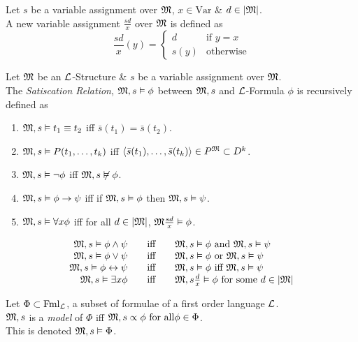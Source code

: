 \documentclass[11pt,a4paper]{article}
\begin{document}
Let $s$ be a variable assignment over $\mathfrak{M}$, $x\in\text{Var}$ \& $d\in|\mathfrak{M}|$.\\
A new variable assignment $\frac{sd}{x}$ over $\mathfrak{M}$ is defined as
$$\frac{sd}{x}(y)=\begin{cases}d&\text{if }y=x\\s(y)&\text{otherwise}\end{cases}$$

Let $\mathfrak{M}$ be an $\mathcal{L}$-Structure \& $s$ be a variable assignment over $\mathfrak{M}$.\\
The \textit{Satiscation Relation}, $\mathfrak{M},s\vDash\phi$ between $\mathfrak{M},s$ and $\mathcal{L}$-Formula $\phi$ is recursively defined as
\begin{enumerate}
	\item $\mathfrak{M},s\vDash t_1\equiv t_2$ iff $\bar{s}(t_1)=\bar{s}(t_2)$.
	\item $\mathfrak{M},s\vDash P(t_1,\dots,t_k)$ iff $\langle\bar{s}(t_1),\dots,\bar{s}(t_k)\rangle\in P^{\mathfrak{M}}\subset D^k$.
	\item $\mathfrak{M},s\vDash \neg\phi$ iff $\mathfrak{M},s\not\vDash\phi$.
	\item $\mathfrak{M},s\vDash\phi\to\psi$ iff if $\mathfrak{M},s\vDash\phi$ then $\mathfrak{M},s\vDash\psi$.
	\item $\mathfrak{M},s\vDash \forall x\phi$ iff for all $d\in|\mathfrak{M}|$, $\mathfrak{M}\frac{sd}{x}\vDash\phi$.
\end{enumerate}

\[\begin{array}{rcl}
\mathfrak{M},s\vDash\phi\wedge\psi&\quad\text{iff}\quad&\mathfrak{M},s\vDash\phi\text{ and }\mathfrak{M},s\vDash\psi\\
\mathfrak{M},s\vDash\phi\vee\psi&\text{iff}&\mathfrak{M},s\vDash\phi\text{ or }\mathfrak{M},s\vDash\psi\\
\mathfrak{M},s\vDash\phi\leftrightarrow\psi&\quad\text{iff}\quad&\mathfrak{M},s\vDash\phi\text{ iff }\mathfrak{M},s\vDash\psi\\
\mathfrak{M},s\vDash\exists x\phi&\quad\text{iff}\quad&\mathfrak{M},s\frac{d}{x}\vDash\phi\text{ for some }d\in|\mathfrak{M}|
\end{array}\]

Let $\Phi\subset\text{Fml}_{\mathcal{L}}$, a subset of formulae of a first order language $\mathcal{L}$.\\
$\mathfrak{M},s$ is a \textit{model} of $\Phi$ iff $\mathfrak{M},s\propto\phi\text{ for all}\phi\in\Phi$.\\
\nb This is denoted $\mathfrak{M},s\vDash\Phi$.\\
\end{document}
